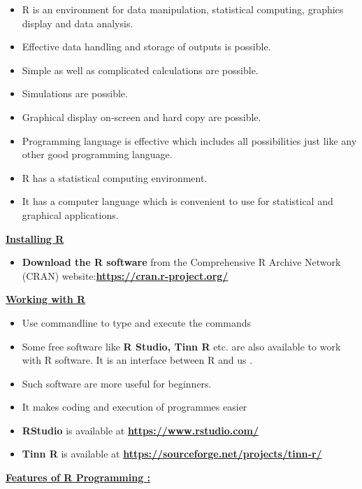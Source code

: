 \documentclass[
]{article}
\providecommand{\tightlist}{%
  \setlength{\itemsep}{0pt}\setlength{\parskip}{0pt}}
\begin{document}
\begin{itemize}
\item
  R is an environment for data manipulation, statistical computing,
  graphics display and data analysis.
\item
  Effective data handling and storage of outputs is possible.
\item
  Simple as well as complicated calculations are possible.
\item
  Simulations are possible.
\item
  Graphical display on‐screen and hard copy are possible.
\item
  Programming language is effective which includes all possibilities
  just like any other good programming language.
\item
  R has a statistical computing environment.
\item
  It has a computer language which is convenient to use for statistical
  and graphical applications.
\end{itemize}

\ul{\textbf{Installing R}}

\begin{itemize}
\tightlist
\item
  \textbf{Download the R software} from the Comprehensive R Archive
  Network (CRAN)
  website:\href{https://cran.r-project.org/}{\textbf{https://cran.r-project.org/}}
\end{itemize}

\ul{\textbf{Working with R}}

\begin{itemize}
\item
  Use commandline to type and execute the commands
\item
  Some free software like \textbf{R Studio, Tinn R} etc. are also
  available to work with R software. It is an interface between R and us
  .
\item
  Such software are more useful for beginners.
\item
  It makes coding and execution of programmes easier
\item
  \textbf{RStudio} is available at
  \href{https://www.rstudio.com/}{\textbf{https://www.rstudio.com/}}
\item
  \textbf{Tinn R} is available at
  \href{https://sourceforge.net/projects/tinn‐r/}{\textbf{https://sourceforge.net/projects/tinn‐r/}}
\end{itemize}

\ul{\textbf{Features of R Programming :}}
\end{document}
